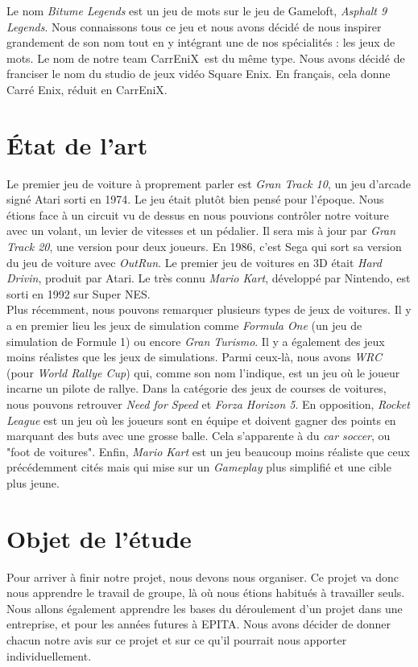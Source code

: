 \documentclass[12pt,a4paper]{article}
\newcommand{\CEX}{CarrEniX}
\begin{document}
\indent Le nom \textit{Bitume Legends} est un jeu de mots sur le jeu de Gameloft, \textit{Asphalt 9 Legends}.
Nous connaissons tous ce jeu et nous avons décidé de nous inspirer grandement de son nom tout en y intégrant
une de nos spécialités : les jeux de mots. Le nom de notre team \CEX\, est du même type. Nous avons décidé
de franciser le nom du studio de jeux vidéo Square Enix. En français, cela donne Carré Enix, réduit en
\CEX.\\

\section{État de l'art}
Le premier jeu de voiture à proprement parler est \textit{Gran Track 10}, un jeu d'arcade signé Atari 
sorti en 1974. Le jeu était plutôt bien pensé pour l'époque. Nous étions face à un 
circuit vu de dessus en nous pouvions contrôler notre voiture avec un volant, un levier de vitesses
et un pédalier. Il sera mis à jour par \textit{Gran Track 20}, une version pour deux joueurs.
En 1986, c'est Sega qui sort sa version du jeu de voiture avec \textit{OutRun}. Le premier 
jeu de voitures en 3D était \textit{Hard Drivin}, produit par Atari. Le très connu \textit{Mario Kart},
développé par Nintendo, est sorti en 1992 sur Super NES.\\

\indent Plus récemment, nous pouvons remarquer plusieurs types de jeux de voitures. Il y a en premier lieu 
les jeux de simulation comme \textit{Formula One} (un jeu de simulation de Formule 1) ou encore 
\textit{Gran Turismo}. Il y a également des jeux moins réalistes
que les jeux de simulations. Parmi ceux-là, nous avons \textit{WRC} (pour \textit{World Rallye Cup})
qui, comme son nom l'indique, est un jeu où le joueur incarne un pilote de rallye. Dans la 
catégorie des jeux de courses de voitures, nous pouvons retrouver 
\textit{Need for Speed} et \textit{Forza Horizon 5}.
En opposition, \textit{Rocket League} est un jeu où les joueurs sont en équipe  et doivent gagner des
points en marquant des buts avec une grosse balle. Cela s'apparente à du \textit{car soccer}, ou "foot
de voitures".
Enfin, \textit{Mario Kart} est un jeu beaucoup moins réaliste
que ceux précédemment cités mais qui mise sur un \textit{Gameplay} plus simplifié et une cible plus jeune. 
\clearpage

\section{Objet de l'étude}
Pour arriver à finir notre projet, nous devons nous organiser.
Ce projet va donc nous apprendre le travail de groupe, là où nous étions habitués à travailler seuls. 
Nous allons également apprendre les bases du déroulement d'un projet dans une entreprise, 
et pour les années futures à EPITA. Nous avons décider de donner chacun notre avis sur ce projet et sur ce 
qu'il pourrait nous apporter individuellement.\\
\end{document}
